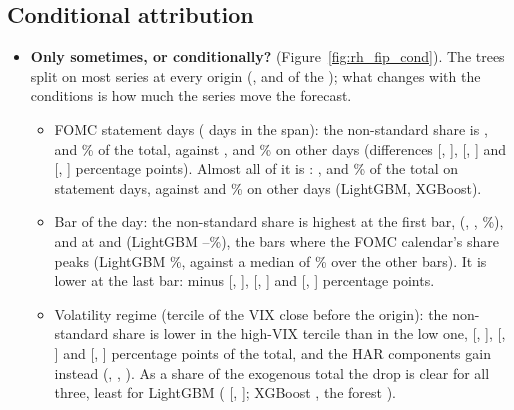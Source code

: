 \subsection{Conditional attribution}
\label{app:rh_fi_cond}
\begin{itemize}
\item \textbf{Only sometimes, or conditionally?} (Figure~\ref{fig:rh_fip_cond}). The trees split on most series at
  every origin (\rhfipLgbmNUsedAll, \rhfipXgbNUsedAll{} and \rhfipRfNUsedAll{} of the \rhfipNExog); what changes with
  the conditions is how much the series move the forecast.
  \begin{itemize}
  \item FOMC statement days (\rhfipFomcDays{} days in the span): the non-standard share is \rhfipLgbmNsFomc,
    \rhfipXgbNsFomc{} and \rhfipRfNsFomc\% of the total, against \rhfipLgbmNsOther, \rhfipXgbNsOther{} and
    \rhfipRfNsOther\% on other days (differences \rhfipLgbmFomcDiff{} [\rhfipLgbmFomcDiffLo, \rhfipLgbmFomcDiffHi],
    \rhfipXgbFomcDiff{} [\rhfipXgbFomcDiffLo, \rhfipXgbFomcDiffHi] and \rhfipRfFomcDiff{} [\rhfipRfFomcDiffLo,
    \rhfipRfFomcDiffHi] percentage points). Almost all of it is \rhfipFomcUntil: \rhfipLgbmUntilFomc,
    \rhfipXgbUntilFomc{} and \rhfipRfUntilFomc\% of the total on statement days, against \rhfipLgbmUntilOther{} and
    \rhfipXgbUntilOther\% on other days (LightGBM, XGBoost).
  \item Bar of the day: the non-standard share is highest at the first bar, \rhfipBarFirst{} (\rhfipLgbmNsFirstBar,
    \rhfipXgbNsFirstBar, \rhfipRfNsFirstBar\%), and at \rhfipBarPeakA{} and \rhfipBarPeakB{} (LightGBM
    \rhfipLgbmNsAftMin--\rhfipLgbmNsAftMax\%), the bars where the FOMC calendar's share peaks (LightGBM
    \rhfipLgbmFomcBucketAft\%, against a median of \rhfipLgbmFomcBucketOtherBars\% over the other bars). It is lower
    at the last bar: \rhfipBarLast{} minus \rhfipBarFirst{} \rhfipLgbmLateDiff{} [\rhfipLgbmLateDiffLo,
    \rhfipLgbmLateDiffHi], \rhfipXgbLateDiff{} [\rhfipXgbLateDiffLo, \rhfipXgbLateDiffHi] and \rhfipRfLateDiff{}
    [\rhfipRfLateDiffLo, \rhfipRfLateDiffHi] percentage points.
  \item Volatility regime (tercile of the VIX close before the origin): the non-standard share is lower in the
    high-VIX tercile than in the low one, \rhfipLgbmVixDiff{} [\rhfipLgbmVixDiffLo, \rhfipLgbmVixDiffHi],
    \rhfipXgbVixDiff{} [\rhfipXgbVixDiffLo, \rhfipXgbVixDiffHi] and \rhfipRfVixDiff{} [\rhfipRfVixDiffLo,
    \rhfipRfVixDiffHi] percentage points of the total, and the HAR components gain instead (\rhfipLgbmVixHar,
    \rhfipXgbVixHar, \rhfipRfVixHar). As a share of the exogenous total the drop is clear for all three, least for
    LightGBM (\rhfipLgbmVixDiffEx{} [\rhfipLgbmVixDiffExLo, \rhfipLgbmVixDiffExHi]; XGBoost \rhfipXgbVixDiffEx, the
    forest \rhfipRfVixDiffEx).
  \end{itemize}
\end{itemize}

